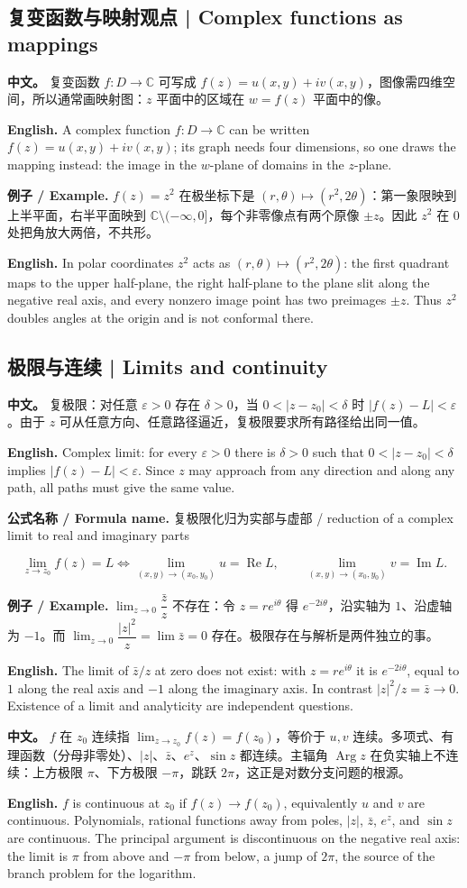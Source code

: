 \documentclass[UTF8,11pt,a4paper]{ctexart}
\newcommand{\EN}[1]{\par\noindent \textbf{English.} #1\par}
\newcommand{\FORMULA}[2]{\par\noindent\textbf{公式名称 / Formula name.} #1 / #2\par}
\newcommand{\EX}[2]{\par\noindent \textbf{例子 / Example.} #1\par\EN{#2}}
\newcommand{\APS}[2]{\par\noindent\textbf{中文。} #1\par\noindent\textbf{English.} #2\par\smallskip}
\begin{document}
\subsection{复变函数与映射观点 | Complex functions as mappings}
\APS{复变函数 $f:D\to\mathbb C$ 可写成 $f(z)=u(x,y)+iv(x,y)$，图像需四维空间，所以通常画映射图：$z$ 平面中的区域在 $w=f(z)$ 平面中的像。}{A complex function $f:D\to\mathbb C$ can be written $f(z)=u(x,y)+iv(x,y)$; its graph needs four dimensions, so one draws the mapping instead: the image in the $w$-plane of domains in the $z$-plane.}
\EX{$f(z)=z^2$ 在极坐标下是 $(r,\theta)\mapsto(r^2,2\theta)$：第一象限映到上半平面，右半平面映到 $\mathbb C\setminus(-\infty,0]$，每个非零像点有两个原像 $\pm z$。因此 $z^2$ 在 $0$ 处把角放大两倍，不共形。}{In polar coordinates $z^2$ acts as $(r,\theta)\mapsto(r^2,2\theta)$: the first quadrant maps to the upper half-plane, the right half-plane to the plane slit along the negative real axis, and every nonzero image point has two preimages $\pm z$. Thus $z^2$ doubles angles at the origin and is not conformal there.}

\subsection{极限与连续 | Limits and continuity}
\APS{复极限：对任意 $\varepsilon>0$ 存在 $\delta>0$，当 $0<|z-z_0|<\delta$ 时 $|f(z)-L|<\varepsilon$。由于 $z$ 可从任意方向、任意路径逼近，复极限要求所有路径给出同一值。}{Complex limit: for every $\varepsilon>0$ there is $\delta>0$ such that $0<|z-z_0|<\delta$ implies $|f(z)-L|<\varepsilon$. Since $z$ may approach from any direction and along any path, all paths must give the same value.}
\FORMULA{复极限化归为实部与虚部}{reduction of a complex limit to real and imaginary parts}
\[
\lim_{z\to z_0}f(z)=L
\iff
\lim_{(x,y)\to(x_0,y_0)}u=\operatorname{Re}L,\qquad
\lim_{(x,y)\to(x_0,y_0)}v=\operatorname{Im}L.
\]
\EX{$\lim_{z\to0}\dfrac{\bar z}{z}$ 不存在：令 $z=re^{i\theta}$ 得 $e^{-2i\theta}$，沿实轴为 $1$、沿虚轴为 $-1$。而 $\lim_{z\to0}\dfrac{|z|^2}{z}=\lim\bar z=0$ 存在。极限存在与解析是两件独立的事。}{The limit of $\bar z/z$ at zero does not exist: with $z=re^{i\theta}$ it is $e^{-2i\theta}$, equal to $1$ along the real axis and $-1$ along the imaginary axis. In contrast $|z|^2/z=\bar z\to0$. Existence of a limit and analyticity are independent questions.}
\APS{$f$ 在 $z_0$ 连续指 $\lim_{z\to z_0}f(z)=f(z_0)$，等价于 $u,v$ 连续。多项式、有理函数（分母非零处）、$|z|$、$\bar z$、$e^z$、$\sin z$ 都连续。主辐角 $\operatorname{Arg}z$ 在负实轴上不连续：上方极限 $\pi$、下方极限 $-\pi$，跳跃 $2\pi$，这正是对数分支问题的根源。}{$f$ is continuous at $z_0$ if $f(z)\to f(z_0)$, equivalently $u$ and $v$ are continuous. Polynomials, rational functions away from poles, $|z|$, $\bar z$, $e^z$, and $\sin z$ are continuous. The principal argument is discontinuous on the negative real axis: the limit is $\pi$ from above and $-\pi$ from below, a jump of $2\pi$, the source of the branch problem for the logarithm.}
\end{document}
